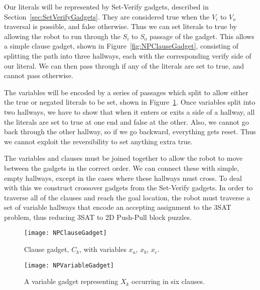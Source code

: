 Our literals will be represented by Set-Verify gadgets, described in Section~\ref{sec:SetVerifyGadgets}. They are considered true when the $V_i$ to $V_o$ traversal is possible, and false otherwise. Thus we can set literals to true by allowing the robot to run through the $S_i$ to $S_o$ passage of the gadget. This allows a simple clause gadget, shown in Figure~\ref{fig:NPClauseGadget}, consisting of splitting the path into three hallways, each with the corresponding verify side of our literal. We can then pass through if any of the literals are set to true, and cannot pass otherwise.

The variables will be encoded by a series of passages which split to allow either the true or negated literals to be set, shown in Figure~\ref{fig:NPVariableGadget}. Once variables split into two hallways, we have to show that when it enters or exits a side of a hallway, all the literals are set to true at one end and false at the other. Also, we cannot go back through the other hallway, so if we go backward, everything gets reset. Thus we cannot exploit the reversibility to set anything extra true.

The variables and clauses must be joined together to allow the robot to move between the gadgets in the correct order. We can connect these with simple, empty hallways, except in the cases where these hallways must cross. To deal with this we construct crossover gadgets from the Set-Verify gadgets. In order to traverse all of the clauses and reach the goal location, the robot must traverse a set of variable hallways that encode an accepting assignment to the 3SAT problem, thus reducing 3SAT to 2D Push-Pull block puzzles.


\begin{figure}[!ht]
\begin{minipage}{.36\textwidth}
    \texttt{[image: NPClauseGadget]}
    \caption{Clause gadget, $C_k$, with variables $x_a$, $x_b$, $x_c$.}
    \label{fig:NPClauseGadget}
\end{minipage}
\hspace{5mm}
\begin{minipage}{.57\textwidth}
  \centering
    \texttt{[image: NPVariableGadget]}
    \caption{A variable gadget representing $X_k$ occurring in six clauses.}
    \label{fig:NPVariableGadget}
\end{minipage}
\end{figure}

